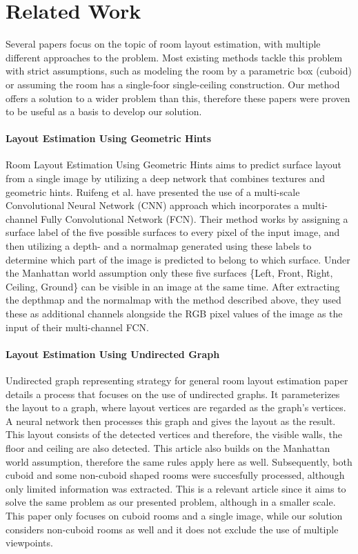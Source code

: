 \section{Related Work}
\label{sec:relatedwork}

Several papers focus on the topic of room layout estimation, with multiple
different approaches to the problem. Most existing methods tackle this problem
with strict assumptions, such as modeling the room by a parametric box (cuboid)
or assuming the room has a single-foor single-ceiling construction. Our method offers a solution to a wider problem than this, therefore these papers were proven to be useful as a basis to develop our solution.

\paragraph{Layout Estimation Using Geometric Hints} Room Layout Estimation Using
Geometric Hints\cite{8451365} aims to predict surface layout from a single image
by utilizing a deep network that combines textures and geometric hints. 
Ruifeng et al. \cite{8451365} have presented the use of a multi-scale 
Convolutional Neural Network (CNN) approach which incorporates a multi-channel
Fully Convolutional Network (FCN).
Their method works by assigning a surface label of the five possible surfaces to
every pixel of the input image, and then utilizing a depth- and a normalmap
generated using these labels to determine which part of the image is predicted to
belong to which surface. Under the Manhattan world assumption\cite{790349} only
these five surfaces \{Left, Front, Right, Ceiling, Ground\} can be visible in an
image at the same time. After extracting the depthmap and the normalmap with the
method described above, they used these as additional channels alongside the RGB
pixel values of the image as the input of their multi-channel FCN.

\paragraph{Layout Estimation Using Undirected Graph}
Undirected graph representing strategy for general room layout estimation\cite{YAO2023103963}
paper details a process that focuses on the use of undirected graphs. It parameterizes the layout to a graph, where layout vertices are regarded as the graph's vertices. A neural network then processes this graph and gives the layout as the result. This layout consists of the detected vertices and therefore, the visible walls, the floor and ceiling are also detected. This article also builds on the Manhattan world assumption\cite{790349}, therefore the same rules apply here as well. Subsequently, both cuboid and some non-cuboid shaped rooms were succesfully processed, although only limited information was extracted. This is a relevant article since it aims to solve the same problem as our presented problem, although in a smaller scale. This paper only focuses on cuboid rooms and a single image, while our solution considers non-cuboid rooms as well and it does not exclude the use of multiple viewpoints. 

